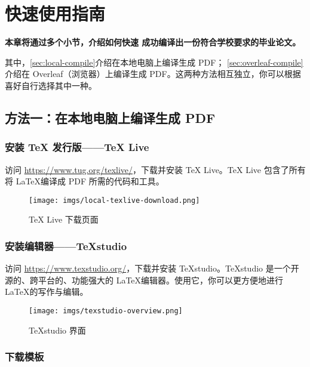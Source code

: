 \chapter{快速使用指南}
\label{ch:quick-start}

\textbf{本章将通过多个小节，介绍如何快速
成功编译出一份符合学校要求的毕业论文。}

其中，\autoref{sec:local-compile}介绍在本地电脑上编译生成 PDF；
\autoref{sec:overleaf-compile}介绍在 Overleaf（浏览器）上编译生成 PDF。这两种方法相互独立，你可以根据喜好自行选择其中一种。

\section{方法一：在本地电脑上编译生成 PDF}
\label{sec:local-compile}

\subsection{安装 TeX 发行版——TeX Live}

访问 \url{https://www.tug.org/texlive/}，下载并安装 TeX Live。TeX Live 包含了所有将 \LaTeX 编译成 PDF 所需的代码和工具。

\begin{figure}[H]
  \begin{center}
    \texttt{[image: imgs/local-texlive-download.png]}
  \end{center}
  \caption{TeX Live 下载页面}
  \label{fig:local-texlive-download}
\end{figure}

\subsection{安装编辑器——TeXstudio}

访问 \url{https://www.texstudio.org/}，下载并安装 TeXstudio。TeXstudio 是一个开源的、跨平台的、功能强大的 \LaTeX 编辑器。使用它，你可以更方便地进行 \LaTeX 的写作与编辑。

\begin{figure}[H]
  \begin{center}
    \texttt{[image: imgs/texstudio-overview.png]}
  \end{center}
  \caption{TeXstudio 界面}
  \label{fig:texstudio-overview}
\end{figure}

\subsection{下载模板}

